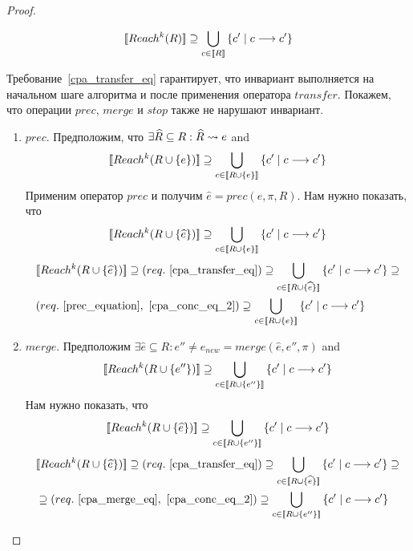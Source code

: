 \begin{proof}
\begin{enumerate}
\begin{equation}
\label{cpa_algorithm_invariant}
\begin{aligned}
\conc{Reach^k(R)} \supseteq \bigcup_{c \in \conc{R}}{\{c' \mid c \tcarrow c'\}}
\end{aligned}
\end{equation}

Требование~\ref{cpa_transfer_eq} гарантирует, что инвариант выполняется на начальном шаге алгоритма и после применения оператора $transfer$.
Покажем, что операции $prec$, $merge$ и $stop$ также не нарушают инвариант.

\begin{enumerate}
\item $prec$. Предположим, что $\exists \widehat{R} \subseteq R: \widehat{R} \leadsto e$ and $$[\![ Reach^k(R \cup \{e\}) ]\!] \supseteq \bigcup_{c \in [\![ R \cup \{e\} ]\!]}{\{c' \mid c \longrightarrow c'\}}$$
Применим оператор $prec$ и получим $\widehat{e} = prec(e, \pi, R)$. Нам нужно показать, что $$[\![ Reach^k(R \cup \{\widehat{e}\}) ]\!] \supseteq \bigcup_{c \in [\![ R \cup \{e\} ]\!]}{\{c' \mid c \longrightarrow c'\}}$$
\begin{align}
& [\![ Reach^k(R \cup \{\widehat{e}\}) ]\!] \supseteq (req.~\ref{cpa_transfer_eq}) \supseteq \bigcup_{c \in [\![ R \cup \{\widehat{e}\} ]\!]}{\{c' \mid c \longrightarrow c'\}} \supseteq \nonumber \\
& (req.~\ref{prec_equation},~\ref{cpa_conc_eq_2}) \supseteq \bigcup_{c \in [\![ R \cup \{e\} ]\!]}{\{c' \mid c \longrightarrow c'\}} \nonumber
\end{align}

\item $merge$. Предположим $\exists \widehat{e} \subseteq R: e'' \neq e_{new} = merge(\widehat{e}, e'', \pi)$ and $$[\![ Reach^k(R \cup \{e''\}) ]\!] \supseteq \bigcup_{c \in [\![ R \cup \{e''\} ]\!]}{\{c' \mid c \longrightarrow c'\}}$$
Нам нужно показать, что $$[\![ Reach^k(R \cup \{\widehat{e}\}) ]\!] \supseteq \bigcup_{c \in [\![ R \cup \{e''\} ]\!]}{\{c' \mid c \longrightarrow c'\}}$$
\begin{align}
& [\![ Reach^k(R \cup \{\widehat{e}\}) ]\!] \supseteq (req.~\ref{cpa_transfer_eq}) \supseteq \bigcup_{c \in [\![ R \cup \{\widehat{e}\} ]\!]}{\{c' \mid c \longrightarrow c'\}} \supseteq \nonumber \\
& \supseteq (req.~\ref{cpa_merge_eq},~\ref{cpa_conc_eq_2}) \supseteq \bigcup_{c \in [\![ R \cup \{e''\} ]\!]}{\{c' \mid c \longrightarrow c'\}} \nonumber
\end{align}


\end{enumerate}
\end{enumerate}
\end{proof}

